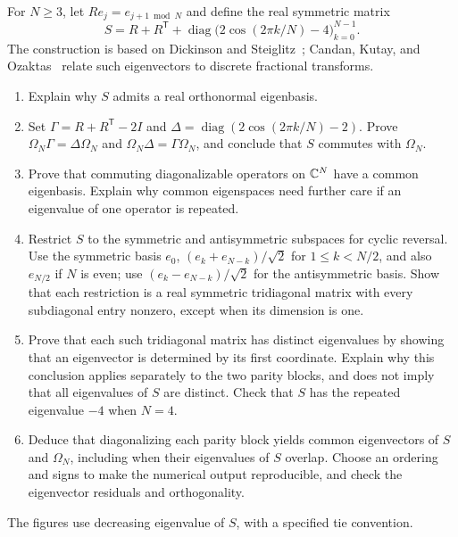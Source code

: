 
\begin{exo}
\label{exo-diagonalization-tfd}\label{notation-50}\label{notation-51}
For $N\geq3$, let $R e_j=e_{j+1\bmod N}$ and define the real symmetric matrix
\[
 S=R+R^{\mathsf T}
       +\operatorname{diag}\bigl(2\cos(2\pi k/N)-4\bigr)_{k=0}^{N-1}.
\]
The construction is based on Dickinson and Steiglitz~\cite{dickinson-eigenvectors};
Candan, Kutay, and Ozaktas~\cite{candan-fractional} relate such eigenvectors
to discrete fractional transforms.
\begin{enumerate}
\item Explain why $S$ admits a real orthonormal eigenbasis.
\item Set $\Gamma=R+R^{\mathsf T}-2I$ and
$\Delta=\operatorname{diag}(2\cos(2\pi k/N)-2)$.
Prove $\Omega_N\Gamma=\Delta\Omega_N$ and
$\Omega_N\Delta=\Gamma\Omega_N$, and conclude that $S$ commutes with $\Omega_N$.
\item Prove that commuting diagonalizable operators on $\mathbb{C}^N$ have a common
eigenbasis. Explain why common eigenspaces need further care if an eigenvalue
of one operator is repeated.
\item Restrict $S$ to the symmetric and antisymmetric subspaces for cyclic
reversal. Use the symmetric basis $e_0$,
$(e_k+e_{N-k})/\sqrt2$ for $1\leq k<N/2$, and also $e_{N/2}$ if $N$ is even;
use $(e_k-e_{N-k})/\sqrt2$ for the antisymmetric basis.
Show that each restriction is a real symmetric tridiagonal matrix with every
subdiagonal entry nonzero, except when its dimension is one.
\item Prove that each such tridiagonal matrix has distinct eigenvalues by
showing that an eigenvector is determined by its first coordinate.
Explain why this conclusion applies separately to the two parity blocks,
and does not imply that all eigenvalues of $S$ are distinct.
Check that $S$ has the repeated eigenvalue $-4$ when $N=4$.
\item Deduce that diagonalizing each parity block yields common eigenvectors
of $S$ and $\Omega_N$, including when their eigenvalues of $S$ overlap.
Choose an ordering and signs to make the numerical output reproducible,
and check the eigenvector residuals and orthogonality.
\end{enumerate}
The figures use decreasing eigenvalue of $S$, with a specified tie convention.

\end{exo}

